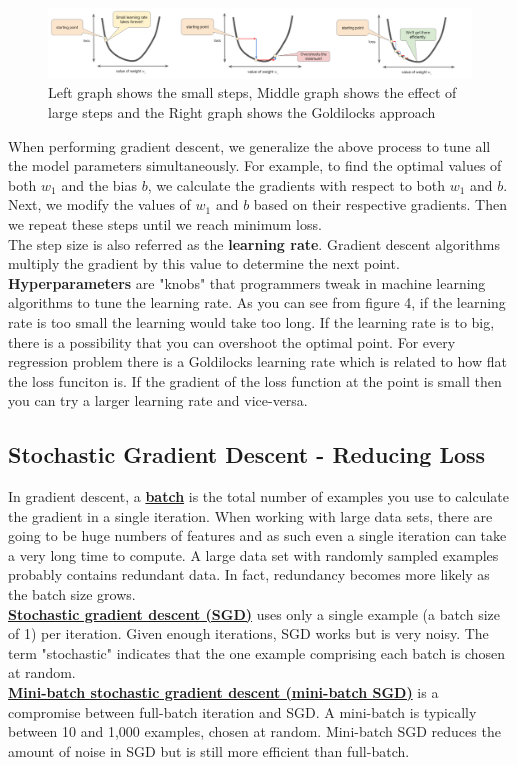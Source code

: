 \documentclass[12pt]{article}
\begin{document}
\begin{figure}[h]
\centering
\includegraphics[scale = 0.85]{imgs/stepSize}
\caption{Left graph shows the small steps, Middle graph shows the effect of large steps and the Right graph shows the Goldilocks approach}
\centering
\end{figure}
When performing gradient descent, we generalize the above process to tune all the model parameters simultaneously. For example, to find the optimal values of both $w_1$ and the bias $b$, we calculate the gradients with respect to both $w_1$ and $b$. Next, we modify the values of $w_1$ and $b$ based on their respective gradients. Then we repeat these steps until we reach minimum loss. \\ 
The step size is also referred as the \textbf{learning rate}. Gradient descent algorithms multiply the gradient by this value to determine the next point. \textbf{Hyperparameters} are "knobs" that programmers tweak in machine learning algorithms to tune the learning rate.
As you can see from figure 4, if the learning rate is too small the learning would take too long. If the learning rate is to big, there is a possibility that you can overshoot the optimal point.
For every regression problem there is a Goldilocks learning rate which is related to how flat the loss funciton is. If the gradient of the loss function at the point is small then you can try a larger learning rate and vice-versa.

\subsection{Stochastic Gradient Descent - Reducing Loss}
In gradient descent, a \href{https://developers.google.com/machine-learning/glossary#batch}{\textbf{batch}} is the total number of examples you use to calculate the gradient in a single iteration. When working with large data sets, there are going to be huge numbers of features and as such even a single iteration can take a very long time to compute.
A large data set with randomly sampled examples probably contains redundant data. In fact, redundancy becomes more likely as the batch size grows.
\\\href{https://developers.google.com/machine-learning/glossary#SGD}{\textbf{Stochastic gradient descent (SGD)}} uses only a single example (a batch size of 1) per iteration. Given enough iterations, SGD works but is very noisy. The term "stochastic" indicates that the one example comprising each batch is chosen at random.
\\\href{https://developers.google.com/machine-learning/glossary#mini-batch}{\textbf{Mini-batch stochastic gradient descent (mini-batch SGD)}} is a compromise between full-batch iteration and SGD. A mini-batch is typically between 10 and 1,000 examples, chosen at random. Mini-batch SGD reduces the amount of noise in SGD but is still more efficient than full-batch.
\end{document}
